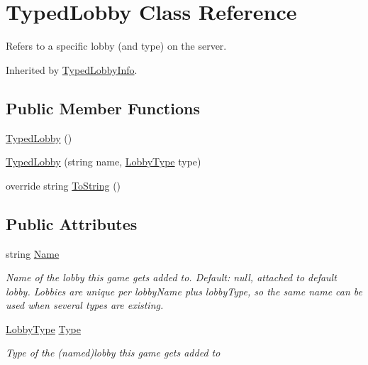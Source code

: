 \hypertarget{class_typed_lobby}{}\section{Typed\+Lobby Class Reference}
\label{class_typed_lobby}


Refers to a specific lobby (and type) on the server.  




Inherited by \hyperlink{class_typed_lobby_info}{Typed\+Lobby\+Info}.

\subsection*{Public Member Functions}
\begin{DoxyCompactItemize}
\item 
\hyperlink{class_typed_lobby_a3cc306cd96153d9e71b905ca7367da77}{Typed\+Lobby} ()
\item 
\hyperlink{class_typed_lobby_aa384f44e95a51cd7b7fd5cfc3354fde3}{Typed\+Lobby} (string name, \hyperlink{_loadbalancing_peer_8cs_ab34738ecd04700648af88bf53d1d74ad}{Lobby\+Type} type)
\item 
override string \hyperlink{class_typed_lobby_a7ba53ade2e4b461836a442872bdb5f71}{To\+String} ()
\end{DoxyCompactItemize}
\subsection*{Public Attributes}
\begin{DoxyCompactItemize}
\item 
string \hyperlink{class_typed_lobby_acd1dfdf3ed901ee8ebe75587fcd0c60b}{Name}
\begin{DoxyCompactList}\small\item\em Name of the lobby this game gets added to. Default\+: null, attached to default lobby. Lobbies are unique per lobby\+Name plus lobby\+Type, so the same name can be used when several types are existing.\end{DoxyCompactList}\item 
\hyperlink{_loadbalancing_peer_8cs_ab34738ecd04700648af88bf53d1d74ad}{Lobby\+Type} \hyperlink{class_typed_lobby_a6f007dbaead56a950745524463ce5219}{Type}
\begin{DoxyCompactList}\small\item\em Type of the (named)lobby this game gets added to\end{DoxyCompactList}\end{DoxyCompactItemize}
